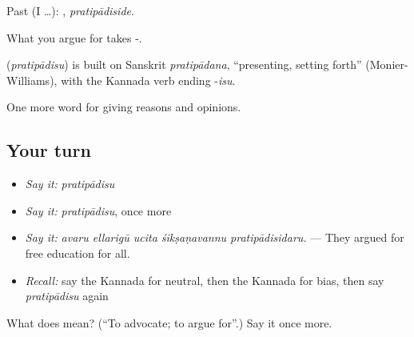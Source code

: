 Past (I …): , \emph{pratipādiside}.

What you argue for takes -.

\begin{cousinweb}
\textbf{} (\emph{pratipādisu}) is built on Sanskrit \emph{pratipādana}, \textquotedblleft{}presenting, setting forth\textquotedblright{} (Monier-Williams), with the Kannada verb ending -\emph{isu}.
\end{cousinweb}

\begin{grammarlens}[title={What you've built}]
One more word for giving reasons and opinions.
\end{grammarlens}

\subsection*{Your turn}
\begin{itemize}
\raggedright
  \item \emph{Say it:} \emph{pratipādisu}
  \item \emph{Say it:} \emph{pratipādisu}, once more
  \item \emph{Say it:} \emph{avaru ellarigū ucita śikṣaṇavannu pratipādisidaru.} — They argued for free education for all.
  \item \emph{Recall:} say the Kannada for neutral, then the Kannada for bias, then say \emph{pratipādisu} again
\end{itemize}

\begin{tcolorbox}[breakable,colback=teal!4,colframe=teal!35!black,title={Before you move on}]
What does  mean? (\textquotedblleft{}To advocate; to argue for\textquotedblright{}.) Say it once more.
\end{tcolorbox}
